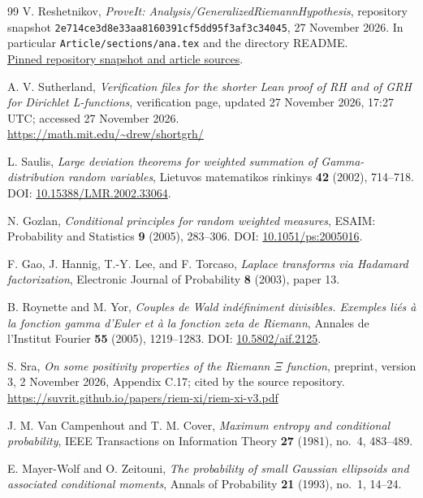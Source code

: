 \documentclass[11pt,letterpaper]{article}
\numberwithin{equation}{section}
\theoremstyle{definition}
\theoremstyle{remark}
\newcommand{\commit}{\texttt{2e714ce3d8e33aa8160391cf5dd95f3af3c34045}}
\begin{document}
\begin{thebibliography}{99}
V. Reshetnikov, \emph{ProveIt: Analysis/GeneralizedRiemannHypothesis}, repository snapshot \commit, 27 November 2026. In particular \texttt{Article/sections/ana.tex} and the directory README.\\
\href{https://github.com/VladimirReshetnikov/ProveIt/tree/2e714ce3d8e33aa8160391cf5dd95f3af3c34045/Analysis/GeneralizedRiemannHypothesis}{Pinned repository snapshot and article sources}.

A. V. Sutherland, \emph{Verification files for the shorter Lean proof of RH and of GRH for Dirichlet L-functions}, verification page, updated 27 November 2026, 17:27 UTC; accessed 27 November 2026.\\
\url{https://math.mit.edu/~drew/shortgrh/}

L. Saulis, \emph{Large deviation theorems for weighted summation of Gamma-distribution random variables}, Lietuvos matematikos rinkinys \textbf{42} (2002), 714--718. DOI: \href{https://doi.org/10.15388/LMR.2002.33064}{10.15388/LMR.2002.33064}.

N. Gozlan, \emph{Conditional principles for random weighted measures}, ESAIM: Probability and Statistics \textbf{9} (2005), 283--306. DOI: \href{https://doi.org/10.1051/ps:2005016}{10.1051/ps:2005016}.

F. Gao, J. Hannig, T.-Y. Lee, and F. Torcaso, \emph{Laplace transforms via Hadamard factorization}, Electronic Journal of Probability \textbf{8} (2003), paper 13.

B. Roynette and M. Yor, \emph{Couples de Wald ind\'efiniment divisibles. Exemples li\'es \`a la fonction gamma d'Euler et \`a la fonction zeta de Riemann}, Annales de l'Institut Fourier \textbf{55} (2005), 1219--1283. DOI: \href{https://doi.org/10.5802/aif.2125}{10.5802/aif.2125}.

S. Sra, \emph{On some positivity properties of the Riemann $\Xi$ function}, preprint, version 3, 2 November 2026, Appendix C.17; cited by the source repository.\\
\url{https://suvrit.github.io/papers/riem-xi/riem-xi-v3.pdf}

J. M. Van Campenhout and T. M. Cover, \emph{Maximum entropy and conditional probability}, IEEE Transactions on Information Theory \textbf{27} (1981), no.~4, 483--489.

E. Mayer-Wolf and O. Zeitouni, \emph{The probability of small Gaussian ellipsoids and associated conditional moments}, Annals of Probability \textbf{21} (1993), no.~1, 14--24.
\end{thebibliography}
\end{document}
